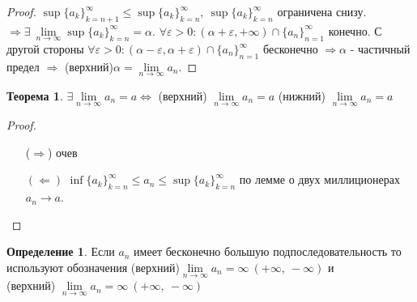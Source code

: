\documentclass[a4paper, 12pt]{article}
\renewcommand{\epsilon}{\varepsilon}
\newcommand{\lra}{\Leftrightarrow}
\newcommand{\lims}{\lim\limits_{n\to \infty}}
\theoremstyle{definition}
\newtheorem*{definition}{Определение}
\newtheorem*{theorem}{Теорема}
\begin{document}
        \begin{proof}
            $\sup \{a_k\}_{k=n+1}^{\infty} \leq \sup \{a_k\}_{k=n}^{\infty},\ \sup\{a_k\}_{k=n}^{\infty}$ ограничена снизу. $\Rightarrow \exists\ \lims \sup\{a_k\}_{k=n}^{\infty}=\alpha$. $\forall \epsilon>0: (\alpha+\epsilon,+\infty)\cap \{a_n\}_{n=1}^{\infty}$ конечно. С другой стороны $\forall \epsilon>0: (\alpha-\epsilon, \alpha+\epsilon)\cap \{a_n\}_{n=1}^{\infty}$ бесконечно $\Rightarrow \alpha$ - частичный предел $\Rightarrow$ (верхний)$\alpha=\lims a_n$.
        \end{proof} 
        \begin{theorem}
            $\exists \lims a_n=a \lra$ (верхний) $\lims a_n =a$ (нижний) $\lims a_n=a$
        \end{theorem} 
        \begin{proof}
            \begin{itemize}
                \item[($\Rightarrow$)] очев
                \item[$(\Leftarrow)$] $\inf \{a_k\}_{k=n}^{\infty}\leq a_n\leq \sup \{a_k\}_{k=n}^{\infty}$ по лемме о двух миллиционерах $a_n \to a$. 
            \end{itemize}
        \end{proof} 
        \begin{definition}
            Если $a_n$ имеет бесконечно большую подпоследовательность то используют обозначения (верхний)$\lims a_n=\infty\ (+\infty,\ -\infty)$ и\\ (верхний) $\lims a_n=\infty\ (+\infty,\ -\infty)$
        \end{definition}
\end{document}
